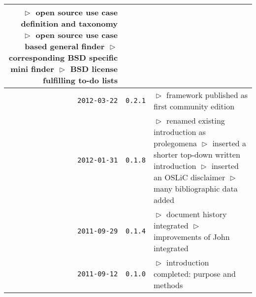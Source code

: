 \begin{table}
\begin{center}
\begin{tabular}{|r|c|p{9.4cm}|}
    $\vartriangleright$ open source use case definition and taxonomy\newline 
    $\vartriangleright$ open source use case based general finder\newline 
    $\vartriangleright$ corresponding BSD specific mini finder\newline 
    $\vartriangleright$ BSD license fulfilling to-do lists\\
\hline
    \texttt{2012-03-22}
  & \texttt{0.2.1} 
  & $\vartriangleright$ framework published as first community edition\\
\hline
    \texttt{2012-01-31}
  & \texttt{0.1.8} 
  & $\vartriangleright$ renamed existing introduction as prolegomena\newline
    $\vartriangleright$ inserted a shorter top-down written introduction\newline
    $\vartriangleright$ inserted an OSLiC disclaimer\newline
    $\vartriangleright$ many bibliographic data added\\
\hline
    \texttt{2011-09-29}
  & \texttt{0.1.4} 
  & $\vartriangleright$ document history integrated\newline
    $\vartriangleright$ improvements of John integrated\\
\hline
    \texttt{2011-09-12}
  & \texttt{0.1.0} 
  & $\vartriangleright$ introduction completed: purpose and methods \\
\hline
\hline 
\end{tabular}
\end{center}
\end{table}

%

